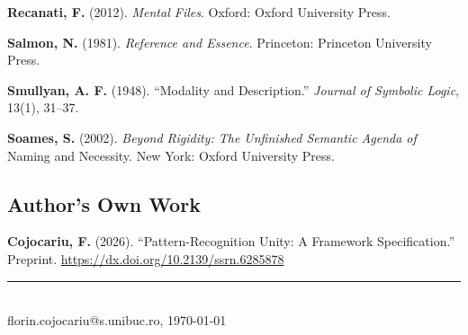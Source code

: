 \documentclass[12pt,a4paper]{article}
\begin{document}
\textbf{Recanati, F.} (2012). \emph{Mental Files}. Oxford: Oxford University Press.

\textbf{Salmon, N.} (1981). \emph{Reference and Essence}. Princeton: Princeton University Press.

\textbf{Smullyan, A. F.} (1948). ``Modality and Description.'' \emph{Journal of Symbolic Logic}, 13(1), 31--37.

\textbf{Soames, S.} (2002). \emph{Beyond Rigidity: The Unfinished Semantic Agenda of} Naming and Necessity. New York: Oxford University Press.

\subsection{Author's Own Work}\label{authors-own-work}

\textbf{Cojocariu, F.} (2026). ``Pattern-Recognition Unity: A Framework Specification.'' Preprint. \url{https://dx.doi.org/10.2139/ssrn.6285878}

\vfill
\noindent\rule{\textwidth}{0.4pt}\\[2pt]
{\tiny florin.cojocariu@s.unibuc.ro, \today}
\end{document}
